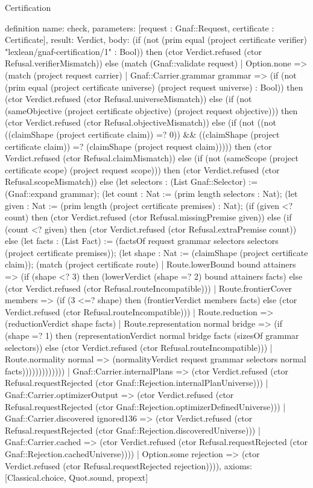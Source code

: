 \begin{lexlean}{Certification}
\begin{semanticmodule}
definition{
  name: check,
  parameters: [request : Gnaf::Request, certificate : Certificate],
  result: Verdict,
  body: (if (not (prim equal (project certificate verifier) "lexlean/gnaf-certification/1" : Bool)) then (ctor Verdict.refused (ctor Refusal.verifierMismatch)) else (match (Gnaf::validate request)
    | Option.none => (match (project request carrier)
      | Gnaf::Carrier.grammar grammar => (if (not (prim equal (project certificate universe) (project request universe) : Bool)) then (ctor Verdict.refused (ctor Refusal.universeMismatch)) else (if (not (sameObjective (project certificate objective) (project request objective))) then (ctor Verdict.refused (ctor Refusal.objectiveMismatch)) else (if (not ((not ((claimShape (project certificate claim)) =? 0)) && ((claimShape (project certificate claim)) =? (claimShape (project request claim))))) then (ctor Verdict.refused (ctor Refusal.claimMismatch)) else (if (not (sameScope (project certificate scope) (project request scope))) then (ctor Verdict.refused (ctor Refusal.scopeMismatch)) else (let selectors : (List Gnaf::Selector) := (Gnaf::expand grammar); (let count : Nat := (prim length selectors : Nat); (let given : Nat := (prim length (project certificate premises) : Nat); (if (given <? count) then (ctor Verdict.refused (ctor Refusal.missingPremise given)) else (if (count <? given) then (ctor Verdict.refused (ctor Refusal.extraPremise count)) else (let facts : (List Fact) := (factsOf request grammar selectors selectors (project certificate premises)); (let shape : Nat := (claimShape (project certificate claim)); (match (project certificate route)
        | Route.lowerBound bound attainers => (if (shape <? 3) then (lowerVerdict (shape =? 2) bound attainers facts) else (ctor Verdict.refused (ctor Refusal.routeIncompatible)))
        | Route.frontierCover members => (if (3 <=? shape) then (frontierVerdict members facts) else (ctor Verdict.refused (ctor Refusal.routeIncompatible)))
        | Route.reduction => (reductionVerdict shape facts)
        | Route.representation normal bridge => (if (shape =? 1) then (representationVerdict normal bridge facts (sizesOf grammar selectors)) else (ctor Verdict.refused (ctor Refusal.routeIncompatible)))
        | Route.normality normal => (normalityVerdict request grammar selectors normal facts)))))))))))))
      | Gnaf::Carrier.internalPlans => (ctor Verdict.refused (ctor Refusal.requestRejected (ctor Gnaf::Rejection.internalPlanUniverse)))
      | Gnaf::Carrier.optimizerOutput => (ctor Verdict.refused (ctor Refusal.requestRejected (ctor Gnaf::Rejection.optimizerDefinedUniverse)))
      | Gnaf::Carrier.discovered ignored136 => (ctor Verdict.refused (ctor Refusal.requestRejected (ctor Gnaf::Rejection.discoveredUniverse)))
      | Gnaf::Carrier.cached => (ctor Verdict.refused (ctor Refusal.requestRejected (ctor Gnaf::Rejection.cachedUniverse))))
    | Option.some rejection => (ctor Verdict.refused (ctor Refusal.requestRejected rejection)))),
  axioms: [Classical.choice, Quot.sound, propext]
}
\end{semanticmodule}
\end{lexlean}
